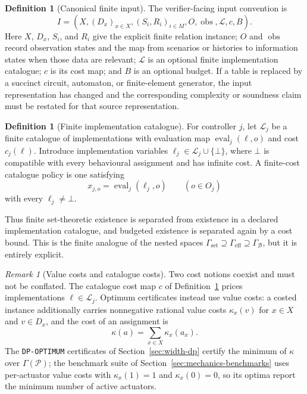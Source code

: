 \documentclass[11pt]{article}
\theoremstyle{plain}
\theoremstyle{definition}
\newtheorem{definition}[theorem]{Definition}
\theoremstyle{remark}
\newtheorem{remark}[theorem]{Remark}
\newcommand{\GammaSet}{\Gamma_{\mathrm{set}}}
\newcommand{\GammaEff}{\Gamma_{\mathrm{eff}}}
\newcommand{\GammaB}{\Gamma_{\mathcal B}}
\begin{document}
\begin{definition}[Canonical finite input]
\label{def:canonical-input}
The verifier-facing input convention is
\[
I=(X,(D_x)_{x\in X},(S_i,R_i)_{i\in M},O,\operatorname{obs},
\mathcal L,c,B).
\]
Here \(X\), \(D_x\), \(S_i\), and \(R_i\) give the explicit finite relation
instance; \(O\) and \(\operatorname{obs}\) record observation states and the map
from scenarios or histories to information states when those data are relevant;
\(\mathcal L\) is an optional finite implementation catalogue; \(c\) is its cost
map; and \(B\) is an optional budget.  If a table is replaced by a succinct
circuit, automaton, or finite-element generator, the input representation has
changed and the corresponding complexity or soundness claim must be restated for
that source representation.
\end{definition}

\begin{definition}[Finite implementation catalogue]
For controller \(j\), let \(\mathcal L_j\) be a finite catalogue of
implementations with evaluation map \(\operatorname{eval}_j(\ell,o)\) and cost
\(c_j(\ell)\).  Introduce implementation variables
\(\ell_j\in\mathcal L_j\cup\{\bot\}\), where \(\bot\) is compatible with every
behavioural assignment and has infinite cost.  A finite-cost catalogue policy is
one satisfying
\[
  x_{j,o}=\operatorname{eval}_j(\ell_j,o)
  \qquad(o\in O_j)
\]
with every \(\ell_j\ne\bot\).
\end{definition}

Thus finite set-theoretic existence is separated from existence in a declared
implementation catalogue, and budgeted existence is separated again by a cost
bound.  This is the finite analogue of the nested spaces
\(\GammaSet\supseteq\GammaEff\supseteq\GammaB\), but it is entirely explicit.

\begin{remark}[Value costs and catalogue costs]
\label{rem:costs}
Two cost notions coexist and must not be conflated.  The catalogue cost map
\(c\) of Definition~\ref{def:canonical-input} prices implementations
\(\ell\in\mathcal L_j\).  Optimum certificates instead use value costs: a
costed instance additionally carries nonnegative rational value costs
\(\kappa_x(v)\) for \(x\in X\) and \(v\in D_x\), and the cost of an
assignment is
\[
  \kappa(a)=\sum_{x\in X}\kappa_x(a_x).
\]
The \texttt{DP-OPTIMUM} certificates of Section~\ref{sec:width-dp} certify
the minimum of \(\kappa\) over \(\Gamma(\mathcal P)\); the benchmark suite of
Section~\ref{sec:mechanics-benchmarks} uses per-actuator value costs with
\(\kappa_x(1)=1\) and \(\kappa_x(0)=0\), so its optima report the minimum
number of active actuators.
\end{remark}
\end{document}
